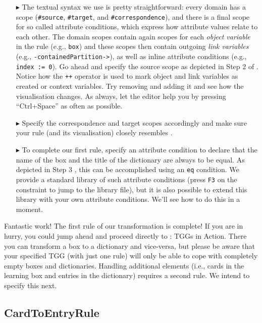 \begin{enumerate}
\item[$\blacktriangleright$] The textual syntax we use is pretty straightforward:  every domain has a scope (\texttt{\#source}, \texttt{\#target}, and \texttt{\#correspondence}), and there is a final scope for so called attribute conditions, which express how attribute values relate to each other.
The domain scopes contain again scopes for each \emph{object variable} in the rule (e.g., \texttt{box}) and these scopes then contain outgoing \emph{link variables} (e.g., \texttt{-contained\-Partition->}), as well as inline attribute conditions (e.g., \texttt{index := 0}).
Go ahead and specify the source scope as depicted in Step 2 of .
Notice how the \texttt{++} operator is used to mark object and link variables as created or context variables.
Try removing and adding it and see how the visualisation changes.  
As always, let the editor help you by pressing ``Ctrl+Space'' as often as possible.

\item[$\blacktriangleright$] Specify the correspondence and target scopes accordingly and make sure your rule (and its visualisation) closely resembles .

\item[$\blacktriangleright$] To complete our first rule, specify an attribute condition to declare that the name of the box and the title of the dictionary are always to be equal.
As depicted in Step 3 , this can be accomplished using an \texttt{eq} condition.
We provide a standard library of such attribute conditions (press \texttt{F3} on the constraint to jump to the library file), but it is also possible to extend this library with your own attribute conditions.
We'll see how to do this in a moment.
\end{enumerate}

Fantastic work! The first rule of our transformation is complete! 
If you are in hurry, you could jump ahead and proceed directly to : TGGs in Action. 
There you can transform a box to a dictionary and vice-versa, but please be aware that your specified TGG (with just one rule) will only be able to cope with completely empty boxes and dictionaries. 
Handling additional elements (i.e., cards in the learning box and entries in the dictionary) requires a second rule.
We intend to specify this next.

\subsection{CardToEntryRule}

